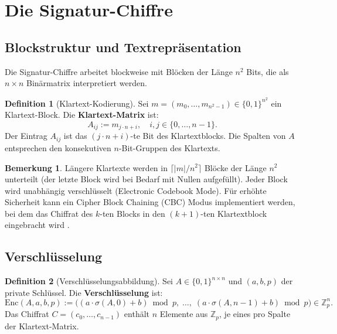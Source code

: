 ﻿\documentclass[a4paper,12pt]{scrreprt}
\theoremstyle{definition}
\newtheorem{definition}{Definition}[section]
\newtheorem{bemerkung}{Bemerkung}[section]
\begin{document}
\section{Die Signatur-Chiffre}

\subsection{Blockstruktur und Textrepräsentation}

Die Signatur-Chiffre arbeitet blockweise mit Blöcken der Länge $n^2$ Bits, die als $n\times n$ Binärmatrix interpretiert werden.

\begin{definition}[Klartext-Kodierung]
	\label{def:klartext}
	Sei $m = (m_0, \ldots, m_{n^2-1}) \in \{0,1\}^{n^2}$ ein Klartext-Block. Die \textbf{Klartext-Matrix} ist:
	\[
	A_{ij} := m_{j \cdot n + i}, \quad i, j \in \{0,\ldots,n-1\}.
	\]
	Der Eintrag $A_{ij}$ ist das $(j \cdot n + i)$-te Bit des Klartextblocks. Die Spalten von $A$ entsprechen den konsekutiven $n$-Bit-Gruppen des Klartexts.
\end{definition}

\begin{bemerkung}
	Längere Klartexte werden in $\lceil |m| / n^2 \rceil$ Blöcke der Länge $n^2$ unterteilt (der letzte Block wird bei Bedarf mit Nullen aufgefüllt). Jeder Block wird unabhängig verschlüsselt (Electronic Codebook Mode). Für erhöhte Sicherheit kann ein Cipher Block Chaining (CBC) Modus implementiert werden, bei dem das Chiffrat des $k$-ten Blocks in den $(k+1)$-ten Klartextblock eingebracht wird \cite{MvOV96}.
\end{bemerkung}

\subsection{Verschlüsselung}

\begin{definition}[Verschlüsselungsabbildung]
	\label{def:enc}
	Sei $A \in \{0,1\}^{n \times n}$ und $(a, b, p)$ der private Schlüssel. Die \textbf{Verschlüsselung} ist:
	\[
	\mathrm{Enc}(A, a, b, p) := \bigl((a \cdot \sigma(A,0) + b) \bmod p,\;\ldots,\; (a \cdot \sigma(A,n-1) + b) \bmod p\bigr) \in \mathbb{Z}_p^n.
	\]
	Das Chiffrat $C = (c_0, \ldots, c_{n-1})$ enthält $n$ Elemente aus $\mathbb{Z}_p$, je eines pro Spalte der Klartext-Matrix.
\end{definition}
\end{document}
